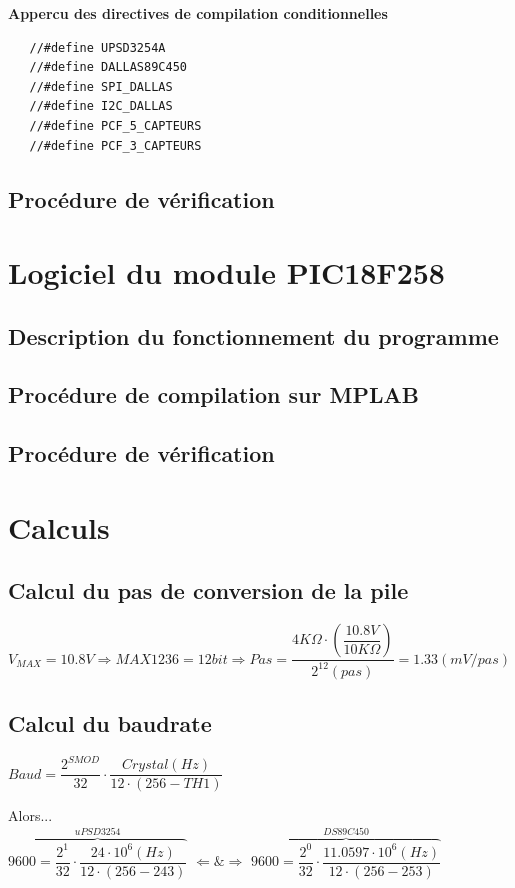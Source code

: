 \documentclass[10pt,a4paper,final]{article}
\begin{document}
\textbf{Appercu des directives de compilation conditionnelles}
\begin{lstlisting}
   //#define UPSD3254A
   //#define DALLAS89C450
   //#define SPI_DALLAS
   //#define I2C_DALLAS
   //#define PCF_5_CAPTEURS
   //#define PCF_3_CAPTEURS
\end{lstlisting}
\begin{spacing}{1.5}
\subsection{Procédure de vérification}


\section{Logiciel du module PIC18F258}
\subsection{Description du fonctionnement du programme}

\subsection{Procédure de compilation sur MPLAB}

\subsection{Procédure de vérification}

\pagebreak
\section{Calculs}
\subsection{Calcul du pas de conversion de la pile}
$V_{MAX}=10.8V \Rightarrow MAX1236  = 12 bit \Rightarrow Pas = \dfrac{4K\Omega \cdot \left(\dfrac{10.8V}{10K\Omega}\right)}{2^{12}(pas)} = 1.33(mV/pas)$
\subsection{Calcul du baudrate}
$Baud = \dfrac{2^{SMOD}}{32}\cdot\dfrac{Crystal (Hz)}{12\cdot(256 - TH1)}$\\
\pagebreak

Alors...\\


$\overbrace{9600 = \dfrac{2^{1}}{32} \cdot \dfrac{24\cdot10^{6}(Hz)}{12\cdot(256 - 243)}}^{uPSD 3254} $ $\Leftarrow \& \Rightarrow $ $ \overbrace{9600 = \dfrac{2^{0}}{32}\cdot \dfrac{11.0597 \cdot 10^{6}(Hz)}{12\cdot(256 - 253)}}^{DS89C450}$






\end{spacing}
\end{document}
